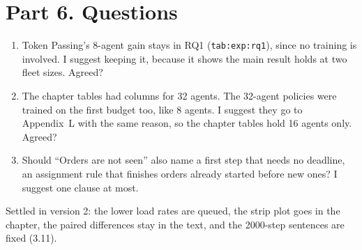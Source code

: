 \documentclass[11pt,a4paper]{article}
\begin{document}
\section*{Part 6. Questions}
\begin{enumerate}[leftmargin=1.5em]
\item Token Passing's 8-agent gain stays in RQ1 (\texttt{tab:exp:rq1}),
  since no training is involved. I suggest keeping it, because it shows the
  main result holds at two fleet sizes. Agreed?
\item The chapter tables had columns for 32 agents. The 32-agent policies
  were trained on the first budget too, like 8 agents. I suggest they go to
  Appendix~L with the same reason, so the chapter tables hold 16 agents
  only. Agreed?
\item Should ``Orders are not seen'' also name a first step that needs no
  deadline, an assignment rule that finishes orders already started before
  new ones? I suggest one clause at most.
\end{enumerate}

Settled in version 2: the lower load rates are queued, the strip plot goes
in the chapter, the paired differences stay in the text, and the
2000-step sentences are fixed (3.11).
\end{document}
